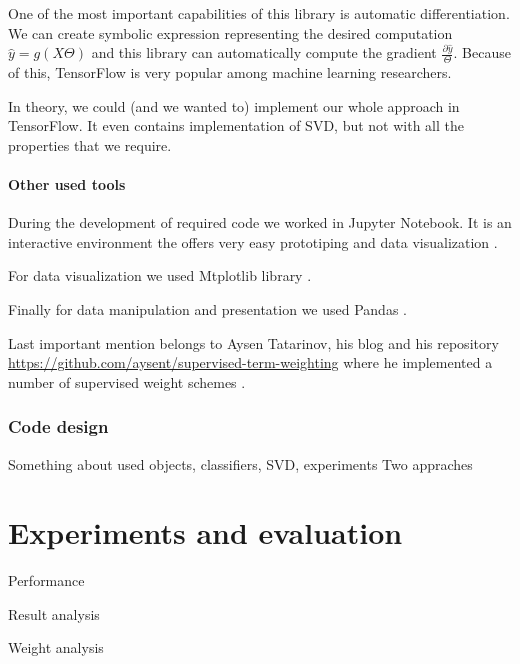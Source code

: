         One of the most important capabilities of this library is automatic differentiation.
        We can create symbolic expression representing the desired computation $\hat{y}=g(X\Theta)$ and this library can automatically compute the gradient $\frac{\partial \hat{y}}{\Theta}$.
        Because of this, TensorFlow is very popular among  machine learning researchers.
        
        In theory, we could (and we wanted to) implement our whole approach in TensorFlow.
        It even contains implementation of SVD, but not with all the properties that we require.
        
        \subsubsection{Other used tools}
        
        During the development of required code we worked in Jupyter Notebook. 
        It is an interactive environment the offers very easy prototiping and
        data visualization \cite{PER-GRA:2007}. %
        
        For data visualization we used Mtplotlib library \cite{hunter2007matplotlib}. %
        
        Finally for data manipulation and presentation we used Pandas \cite{mckinney2010data}. %
        
        Last important mention belongs to Aysen Tatarinov, his blog and his repository \url{https://github.com/aysent/supervised-term-weighting} where he implemented a number of supervised weight schemes \cite{maas2011learning}.
        \* %
        
        \subsection{Code design} 
        \*
        Something about used objects, classifiers, SVD, experiments
        Two appraches
        
        

\chapter{Experiments and evaluation}

    Performance
    
    Result analysis
    
    Weight analysis
    
